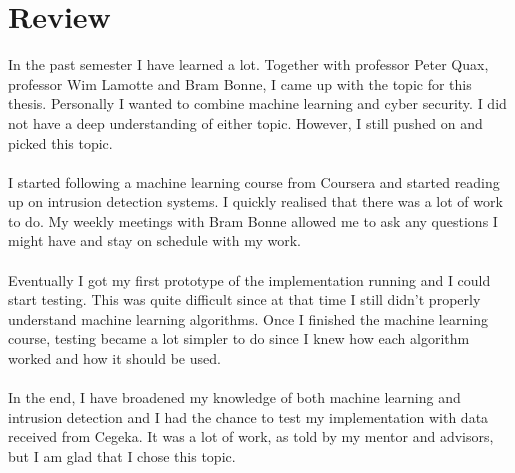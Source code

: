 
\chapter{Review} %

\label{review} %

In the past semester I have learned a lot. Together with professor Peter Quax, professor Wim Lamotte and Bram Bonne, I came up with the topic for this thesis. Personally I wanted to combine machine learning and cyber security. I did not have a deep understanding of either topic. However, I still pushed on and picked this topic. \\
\\
I started following a machine learning course from Coursera and started reading up on intrusion detection systems. I quickly realised that there was a lot of work to do. My weekly meetings with Bram Bonne allowed me to ask any questions I might have and stay on schedule with my work. \\
\\
Eventually I got my first prototype of the implementation running and I could start testing. This was quite difficult since at that time I still didn't properly understand machine learning algorithms. Once I finished the machine learning course, testing became a lot simpler to do since I knew how each algorithm worked and how it should be used. \\
\\
In the end, I have broadened my knowledge of both machine learning and intrusion detection and I had the chance to test my implementation with data received from Cegeka. It was a lot of work, as told by my mentor and advisors, but I am glad that I chose this topic. 